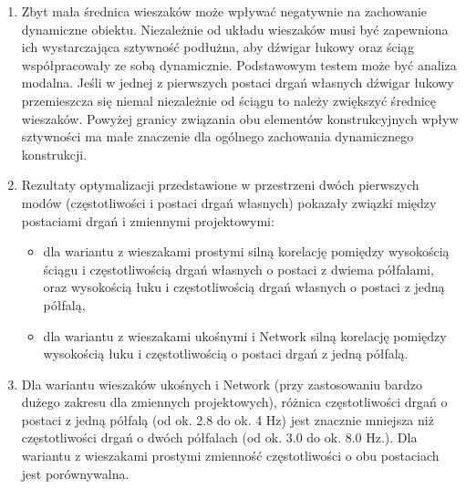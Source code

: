 \begin{enumerate}
\item Zbyt mała średnica wieszaków może wpływać negatywnie na zachowanie dynamiczne obiektu. Niezależnie od układu wieszaków musi być zapewniona ich wystarczająca sztywność podłużna, aby dźwigar łukowy oraz ściąg współpracowały ze sobą dynamicznie. Podstawowym testem może być analiza modalna. Jeśli w jednej z pierwszych postaci drgań własnych dźwigar łukowy przemieszcza się niemal niezależnie od ściągu to należy zwiększyć średnicę wieszaków. Powyżej granicy związania obu elementów konstrukcyjnych wpływ sztywności ma małe znaczenie dla ogólnego zachowania dynamicznego konstrukcji.

\item Rezultaty optymalizacji przedstawione w przestrzeni dwóch pierwszych modów (częstotliwości i postaci drgań własnych) pokazały związki między postaciami drgań i zmiennymi projektowymi:
\begin{itemize} 
	\item dla wariantu z wieszakami prostymi silną korelację pomiędzy wysokością ściągu i częstotliwością drgań własnych o postaci z dwiema półfalami, oraz wysokością łuku i częstotliwością drgań własnych o postaci z jedną półfalą,
	\item dla wariantu z wieszakami ukośnymi i Network silną korelację pomiędzy wysokością łuku i częstotliwością o postaci drgań z jedną półfalą.
\end{itemize}

\item Dla wariantu wieszaków ukośnych i Network (przy zastosowaniu bardzo dużego  zakresu dla zmiennych projektowych), różnica częstotliwości drgań o postaci z jedną półfalą (od ok. 2.8 do ok. 4 Hz) jest znacznie mniejsza niż częstotliwości drgań o dwóch półfalach (od ok. 3.0 do ok. 8.0 Hz.). Dla wariantu z wieszakami prostymi zmienność częstotliwości o obu postaciach jest porównywalna.


\end{enumerate}
